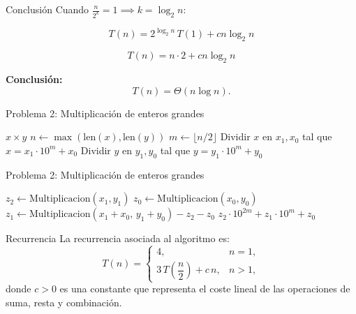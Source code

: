 \documentclass{beamer}
\begin{document}
\begin{frame}{Conclusión}
Cuando \(\tfrac{n}{2^k}=1 \implies k=\log_2 n\):

\[
T(n) = 2^{\log_2 n}\,T(1) + cn\log_2 n
\]

\[
T(n) = n\cdot 2 + cn\log_2 n
\]

\bigskip
\textbf{Conclusión:}
\[
T(n) = \Theta(n\log n).
\]
\end{frame}

\begin{frame}{Problema 2: Multiplicación de enteros grandes}
\begin{algorithm}[H]
\caption{Multiplicación de enteros grandes por divide y vencerás(Parte I)}
\begin{algorithmic}[1]
     \State \Return $x \times y$ 
  \EndIf
  \State $n \gets \max(\text{len}(x), \text{len}(y))$
  \State $m \gets \lfloor n/2 \rfloor$
  \State Dividir $x$ en $x_1, x_0$ tal que $x = x_1 \cdot 10^m + x_0$
  \State Dividir $y$ en $y_1, y_0$ tal que $y = y_1 \cdot 10^m + y_0$
  \EndFunction 
\end{algorithmic}
\end{algorithm}
\end{frame}

\begin{frame}{Problema 2: Multiplicación de enteros grandes }
\begin{algorithm}[H]
\caption{Multiplicación de enteros grandes por divide y vencerás(Parte II)}
\begin{algorithmic}[1]
    \State $z_2 \gets \text{Multiplicacion}(x_1, y_1)$
    \State $z_0 \gets \text{Multiplicacion}(x_0, y_0)$
    \State $z_1 \gets \text{Multiplicacion}(x_1+x_0,\, y_1+y_0) - z_2 - z_0$
    \State \Return $z_2 \cdot 10^{2m} + z_1 \cdot 10^m + z_0$
  \EndFunction                      %
\end{algorithmic}
\end{algorithm}
\end{frame}


\begin{frame}{Recurrencia}
La recurrencia asociada al algoritmo  es:
\[
T(n) =
\begin{cases}
4, & n=1, \\[6pt]
3\,T\!\left(\dfrac{n}{2}\right) + c\,n, & n>1,
\end{cases}
\]
donde $c>0$ es una constante que representa el coste lineal de las operaciones de suma, resta y combinación.
\end{frame}
\end{document}
